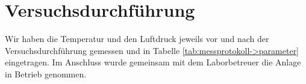 \section{Versuchsdurchführung}
\label{sec:durchfuehrung}
Wir haben die Temperatur und den Luftdruck jeweils vor und nach der Versuchsdurchführung gemessen und in Tabelle \ref{tab:messprotokoll->parameter} eingetragen. Im Anschluss wurde gemeinsam mit dem Laborbetreuer die Anlage in Betrieb genommen.\\

